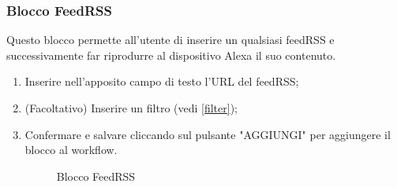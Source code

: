 \subsubsection{Blocco FeedRSS}
Questo blocco permette all'utente di inserire un qualsiasi feedRSS e successivamente far riprodurre al dispositivo Alexa il suo contenuto.
\begin{enumerate}
	\item Inserire nell'apposito campo di testo l'URL del feedRSS;
	\item (Facoltativo) Inserire un filtro (vedi \ref{filter});
	\newpage
	\item Confermare e salvare cliccando sul pulsante "AGGIUNGI" per aggiungere il blocco al workflow.
	\begin{figure}[!ht]
		\centering
		\caption{Blocco FeedRSS}
	\end{figure}
\end{enumerate}


